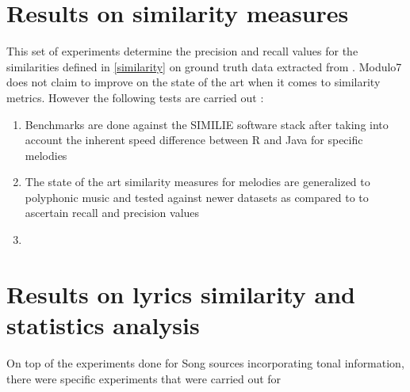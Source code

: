 \section{Results on similarity measures}

\noindent This set of experiments determine the precision and recall values for the similarities defined in \ref{similarity} on ground truth data extracted from \cite{msd}. Modulo7 does not claim to improve on the state of the art when it comes to similarity metrics. However the following tests are carried out : 

\begin{enumerate}
\item Benchmarks are done against the SIMILIE software stack \cite{similie} after taking into account the inherent speed difference between R\cite{similietechnicalmanual} and Java for specific melodies
\item The state of the art similarity measures for melodies are generalized to polyphonic music and tested against newer datasets as compared to \cite{msd} to ascertain recall and precision values
\item 
\end{enumerate}  

\section{Results on lyrics similarity and statistics analysis}

\noindent On top of the experiments done for Song sources incorporating tonal information, there were specific experiments that were carried out for 
